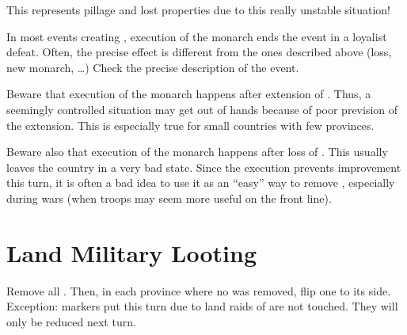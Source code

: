 \begin{designnote}
  This represents pillage and lost properties due to this really unstable
  situation!
\end{designnote}

\bparag In most events creating \REBELLION, execution of the monarch ends the
event in a loyalist defeat. Often, the precise effect is different from the
ones described above (\STAB loss, new monarch, \ldots) Check the precise
description of the event.

\begin{playtip}
  Beware that execution of the monarch happens after extension of
  \REVOLT. Thus, a seemingly controlled situation may get out of hands because
  of poor prevision of the extension. This is especially true for small
  countries with few provinces.

  Beware also that execution of the monarch happens after loss of \STAB. This
  usually leaves the country in a very bad state. Since the execution prevents
  \STAB improvement this turn, it is often a bad idea to use it as an ``easy''
  way to remove \REVOLT, especially during wars (when troops may seem more
  useful on the front line).
\end{playtip}


\section{Land Military Looting}\label{chRedep:Looting}

\bparag Remove all \PILLAGE\Facemoins.
\bparag Then, in each province where no \PILLAGE\Facemoins was removed, flip
one \PILLAGE\Faceplus to its \Facemoins side.
\bparag Exception: \PILLAGE markers put this turn due to land raids of
\corsaire are not touched. They will only be reduced next turn.

